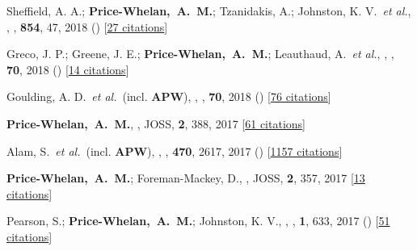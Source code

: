 \item[{\color{deemph}\scriptsize35}]Sheffield, A. A.; \textbf{Price-Whelan,~A.~M.}; Tzanidakis, A.; Johnston, K. V.~\textit{et al.}, , \apj, \textbf{854}, 47, 2018 () [\href{http://adsabs.harvard.edu/abs/2018ApJ...854...47S}{27 citations}]

\item[{\color{deemph}\scriptsize34}]Greco, J. P.; Greene, J. E.; \textbf{Price-Whelan,~A.~M.}; Leauthaud, A.~\textit{et al.}, , \pasj, \textbf{70}, 2018 () [\href{http://adsabs.harvard.edu/abs/2018PASJ...70S..19G}{14 citations}]

\item[{\color{deemph}\scriptsize33}]Goulding, A. D.~\textit{et al.}~(incl. \textbf{APW}), , \pasj, \textbf{70}, 2018 () [\href{http://adsabs.harvard.edu/abs/2018PASJ...70S..37G}{76 citations}]

\item[{\color{deemph}\scriptsize32}]\textbf{Price-Whelan,~A.~M.}, , JOSS, \textbf{2}, 388, 2017 [\href{http://adsabs.harvard.edu/abs/2017JOSS....2..388P}{61 citations}]

\item[{\color{deemph}\scriptsize31}]Alam, S.~\textit{et al.}~(incl. \textbf{APW}), , \mnras, \textbf{470}, 2617, 2017 () [\href{http://adsabs.harvard.edu/abs/2017MNRAS.470.2617A}{1157 citations}]

\item[{\color{deemph}\scriptsize30}]\textbf{Price-Whelan,~A.~M.}; Foreman-Mackey, D., , JOSS, \textbf{2}, 357, 2017 [\href{http://adsabs.harvard.edu/abs/2017JOSS....2..357P}{13 citations}]

\item[{\color{deemph}\scriptsize29}]Pearson, S.; \textbf{Price-Whelan,~A.~M.}; Johnston, K. V., , \natureast, \textbf{1}, 633, 2017 () [\href{http://adsabs.harvard.edu/abs/2017NatAs...1..633P}{51 citations}]

